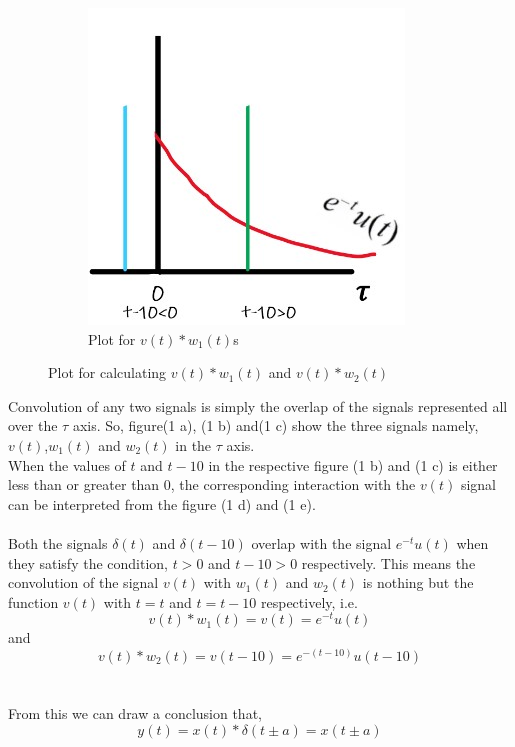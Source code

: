 \documentclass{article}[12 pt]
\begin{document}
\begin{figure}[H]
\begin{subfigure}{.5\textwidth}
  \includegraphics[width=.8\linewidth, height=.8\linewidth]{5.jpg}  
  \caption{Plot for $v(t)*w_1(t)$s}
  \label{fig:sub-fifth}
\end{subfigure}
\caption{Plot for calculating $v(t)*w_1(t)$ and $v(t)*w_2(t)$} 
\label{fig:fig}
\end{figure}
\newpage
Convolution of any two signals is simply the overlap of the signals represented all over the $\tau$ axis. So, figure(1 a), (1 b) and(1 c) show the three signals namely, $v(t)$,$w_1(t)$ and $w_2(t)$ in the $\tau$ axis. \\When the values of $t$ and $t-10$ in the respective figure (1 b) and (1 c) is either less than or greater than 0, the corresponding interaction with the $v(t)$ signal can be interpreted from the figure (1 d) and (1 e).\\\\
Both the signals $\delta(t)$ and $\delta(t-10)$ overlap with the signal $e^{-t}u(t)$ when they satisfy the condition, $t>0$ and $t-10>0$ respectively. This means the convolution of the signal $v(t)$ with $w_1(t)$ and $w_2(t)$ is nothing but the function $v(t)$ with $t=t$ and $t=t-10$ respectively, i.e. 
\begin{equation}
v(t)*w_1(t)=v(t)=e^{-t}u(t)
\end{equation} 
and
\begin{equation}
v(t)*w_2(t)=v(t-10)=e^{-(t-10)}u(t-10)
\end{equation}
\\\\ From this we can draw a conclusion that,
\begin{equation}
y(t)=x(t)*\delta(t \pm a)=x(t \pm a)
\end{equation}
\end{document}

